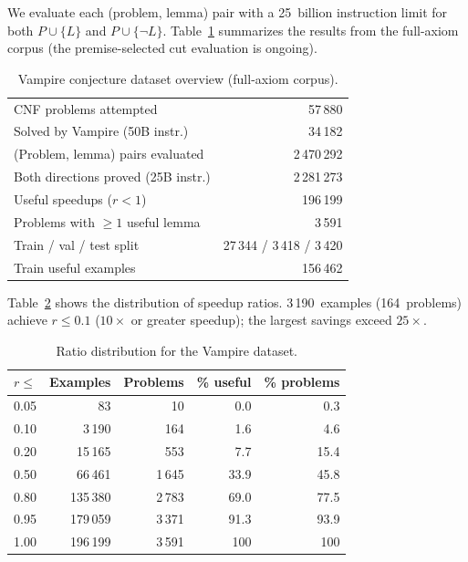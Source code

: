 \documentclass{easychair}
\newcommand{\Vampire}{Vampire\xspace}
\begin{document}
We evaluate each (problem, lemma) pair with a 25~billion instruction
limit for both $P \cup \{L\}$ and $P \cup \{\neg L\}$.
Table~\ref{tab:vampire-stats} summarizes the results from
the full-axiom corpus (the premise-selected cut evaluation is
ongoing).

\begin{table}[t]
\centering
\caption{Vampire conjecture dataset overview (full-axiom corpus).}
\label{tab:vampire-stats}
\begin{tabular}{lr}
\toprule
CNF problems attempted & 57\,880 \\
Solved by Vampire (50B instr.) & 34\,182 \\
(Problem, lemma) pairs evaluated & 2\,470\,292 \\
Both directions proved (25B instr.) & 2\,281\,273 \\
Useful speedups ($r < 1$) & 196\,199 \\
Problems with $\geq 1$ useful lemma & 3\,591 \\
\midrule
Train / val / test split & 27\,344 / 3\,418 / 3\,420 \\
Train useful examples & 156\,462 \\
\bottomrule
\end{tabular}
\end{table}

Table~\ref{tab:ratio-dist} shows the distribution of speedup ratios.
3\,190~examples (164~problems) achieve $r \leq 0.1$ ($10\times$ or
greater speedup); the largest savings exceed $25\times$.

\begin{table}[t]
\centering
\caption{Ratio distribution for the \Vampire dataset.}
\label{tab:ratio-dist}
\begin{tabular}{rrrrr}
\toprule
$r \leq$ & Examples & Problems & \% useful & \% problems \\
\midrule
0.05 &        83 &    10 &  0.0 &  0.3 \\
0.10 &    3\,190 &   164 &  1.6 &  4.6 \\
0.20 &   15\,165 &   553 &  7.7 & 15.4 \\
0.50 &   66\,461 & 1\,645 & 33.9 & 45.8 \\
0.80 &  135\,380 & 2\,783 & 69.0 & 77.5 \\
0.95 &  179\,059 & 3\,371 & 91.3 & 93.9 \\
1.00 &  196\,199 & 3\,591 & 100 & 100 \\
\bottomrule
\end{tabular}
\end{table}
\end{document}
